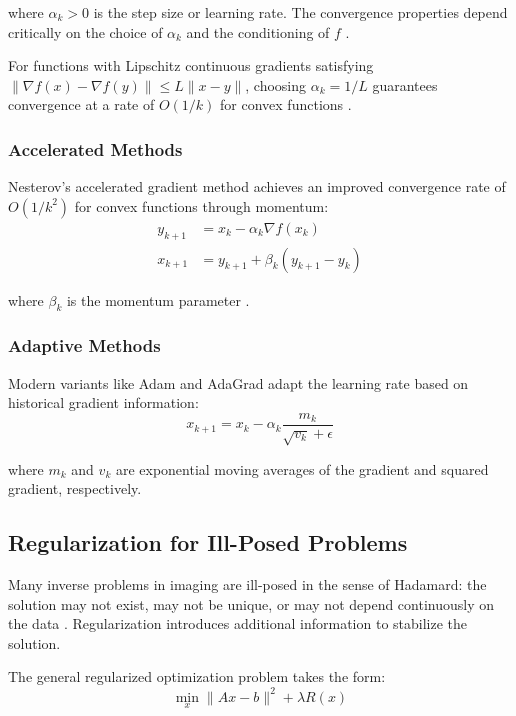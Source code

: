 \documentclass[nomenclature, english, bibtex]{kththesis}
\numberwithin{listing}{chapter}
\begin{document}
where $\alpha_k > 0$ is the step size or learning rate. The convergence properties depend critically on the choice of $\alpha_k$ and the conditioning of $f$ \cite{nesterov2018lectures}.

For functions with Lipschitz continuous gradients satisfying $\|\nabla f(x) - \nabla f(y)\| \leq L\|x - y\|$, choosing $\alpha_k = 1/L$ guarantees convergence at a rate of $O(1/k)$ for convex functions \cite{beck2017first}.

\subsubsection{Accelerated Methods}
Nesterov's accelerated gradient method achieves an improved convergence rate of $O(1/k^2)$ for convex functions through momentum:
\begin{align}
y_{k+1} &= x_k - \alpha_k \nabla f(x_k) \\
x_{k+1} &= y_{k+1} + \beta_k(y_{k+1} - y_k)
\end{align}

where $\beta_k$ is the momentum parameter \cite{nesterov1983method}.

\subsubsection{Adaptive Methods}
Modern variants like Adam \cite{kingma2014adam} and AdaGrad \cite{duchi2011adaptive} adapt the learning rate based on historical gradient information:
\begin{equation}
x_{k+1} = x_k - \alpha_k \frac{m_k}{\sqrt{v_k} + \epsilon}
\end{equation}

where $m_k$ and $v_k$ are exponential moving averages of the gradient and squared gradient, respectively.

\subsection{Regularization for Ill-Posed Problems}

Many inverse problems in imaging are ill-posed in the sense of Hadamard: the solution may not exist, may not be unique, or may not depend continuously on the data \cite{hansen2010discrete}. Regularization introduces additional information to stabilize the solution.

The general regularized optimization problem takes the form:
\begin{equation}
\min_x \|Ax - b\|^2 + \lambda R(x)
\end{equation}
\end{document}
